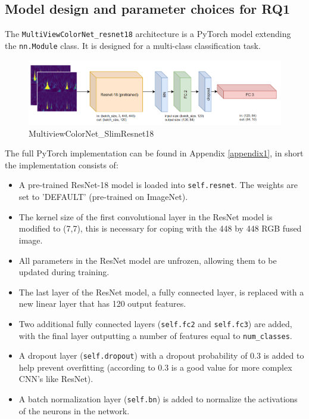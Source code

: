 \subsection{Model design and parameter choices for RQ1}
The \verb|MultiViewColorNet_resnet18| architecture is a PyTorch model extending the \newline \verb|nn.Module| class. It is designed for a multi-class classification task. 
\begin{figure}[H]
    \centering
    \includegraphics[width=1.0\textwidth]{Images/SlimResnet18_Multiview_CL.png}
    \caption{MultiviewColorNet\_SlimResnet18}
    \label{fig:slimresnet18_multiview}
\end{figure}
The full PyTorch implementation can be found in Appendix \ref{appendix1}, in short the implementation consists of:
\begin{itemize}
    \item A pre-trained ResNet-18 model is loaded into \verb|self.resnet|. The weights are set to 'DEFAULT' (pre-trained on ImageNet). 
    \item The kernel size of the first convolutional layer in the ResNet model is modified to (7,7), this is necessary for coping with the 448 by 448 RGB fused image. 
    \item All parameters in the ResNet model are unfrozen, allowing them to be updated during training. 
    \item The last layer of the ResNet model, a fully connected layer, is replaced with a new linear layer that has 120 output features. 
    \item Two additional fully connected layers (\verb|self.fc2| and \verb|self.fc3|) are added, with the final layer outputting a number of features equal to \verb|num_classes|.
    \item A dropout layer (\verb|self.dropout|) with a dropout probability of 0.3 is added to help prevent overfitting (according to \citep{park2017analysis} 0.3 is a good value for more complex CNN's like ResNet). 
    \item A batch normalization layer (\verb|self.bn|) is added to normalize the activations of the neurons in the network. 
\end{itemize}

